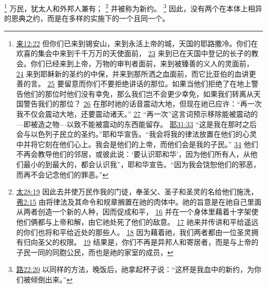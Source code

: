 \documentclass[12pt, a4paper, oneside]{ctexart}
\begin{document}
	\footnote {
		\href{https://biblehub.com/hebrews/12-22.htm}{来12:22} 但你们已来到锡安山，来到永活上帝的城，天国的耶路撒冷。你们在欢喜的集会中来到千千万万的天使面前，
		\href{https://biblehub.com/hebrews/12-23.htm}{23} 来到已在天国中登记的长子的教会。你们已经来到上帝，万物的审判者面前，来到被臻善的义人的灵面前，
		\href{https://biblehub.com/hebrews/12-24.htm}{24} 来到耶稣新的圣约的中保，并来到那所洒之血面前，而它比亚伯的血讲更善的言。
		\href{https://biblehub.com/hebrews/12-25.htm}{25} 要留意而你们不要拒绝讲话的那位。如果当他们拒绝了在地上警告他们的那位时他们没有幸免，那么我们岂不会更少幸免，如果我们转离从天国警告我们的那位？
		\href{https://biblehub.com/hebrews/12-26.htm}{26} 在那时祂的话音震动大地，但现在祂已应许：“再一次我不仅会震动大地，还要震动诸天。”
		\href{https://biblehub.com/hebrews/12-27.htm}{27} “再一次”这言词预示移除能被震动的---即被造之物---以致不能被震动的东西能留存。
		\href{https://biblehub.com/jeremiah/31-33.htm}{耶31:33} “这是我在那时之后会与以色列子民立的圣约。”耶和华宣告。“我会将我的律法放置在他们的心灵中并将它刻在他们心上。我会是他们的上帝，而他们会是我的子民。”
		\href{https://biblehub.com/jeremiah/31-34.htm}{34} 他们不再会教导他们的邻居，或彼此说：‘要认识耶和华’，因为他们所有人，从他们最小的到最大的，都会认识我”，耶和华宣告。“因为我会饶恕他们的邪恶，而再不会记念他们的罪恶。”
	}
	万民，犹太人和外邦人兼有；
	\footnote {
		\href{https://biblehub.com/matthew/28-19.htm}{太28:19} 因此去并使万民作我的门徒，奉圣父、圣子和圣灵的名给他们施洗，
		\href{https://biblehub.com/ephesians/2-15.htm}{弗2:15} 由将律法及其命令和规章搁置在祂的肉体中。祂的旨意是在祂自己里面从两者创造一个新的人种，因而促成和平，
		\href{https://biblehub.com/ephesians/2-16.htm}{16} 并在一个身体里藉着十字架使他们俩都与上帝和解，由它祂处死了他们的敌意。
		\href{https://biblehub.com/ephesians/2-17.htm}{17} 祂来并传讲和平给遥远的你们也将和平给近处的那些人。
		\href{https://biblehub.com/ephesians/2-18.htm}{18} 因为藉着祂，我们两者都由一位圣灵拥有归向圣父的权限。
		\href{https://biblehub.com/ephesians/2-19.htm}{19} 结果是，你们不再是异邦人和寄居者，而是与上帝的子民一同的同胞公民，而也是祂的家室的成员，
	}
	并被称为新约。
	\footnote {
		\href{https://biblehub.com/luke/22-20.htm}{路22:20} 以同样的方法，晚饭后，祂拿起杯子说：“这杯是我血中的新约，为你们被倾倒出来。”
	}
	因此，没有两个在本体上相异的恩典之约，而是在多样的实施下的一个且同一个。
\end{document}

